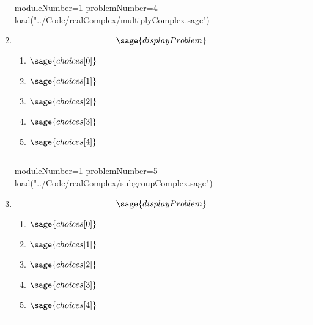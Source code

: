 \documentclass[14pt]{article}
\newcommand{\litem}[1]{\item#1\hspace*{-1cm}\rule{\textwidth}{0.4pt}}
\begin{document}
\begin{enumerate}
\begin{sagesilent}
moduleNumber=1
problemNumber=4
load("../Code/realComplex/multiplyComplex.sage")
\end{sagesilent}

\litem{ 

	\[ \sage{displayProblem} \]

	\begin{enumerate}[label=\Alph*.]
    \item \( \sage{choices[0]} \)
    \item \( \sage{choices[1]} \)
    \item \( \sage{choices[2]} \)
    \item \( \sage{choices[3]} \)
    \item \( \sage{choices[4]} \)
	\end{enumerate}
}

\begin{sagesilent}
moduleNumber=1
problemNumber=5
load("../Code/realComplex/subgroupComplex.sage")
\end{sagesilent}
\litem{ 

\[ \sage{displayProblem} \]

	\begin{enumerate}[label=\Alph*.]
    \item \( \sage{choices[0]} \)
    \item \( \sage{choices[1]} \)
    \item \( \sage{choices[2]} \)
    \item \( \sage{choices[3]} \)
    \item \( \sage{choices[4]} \)
	\end{enumerate} }

\end{enumerate}
\end{document}
